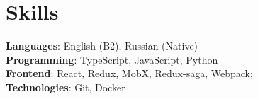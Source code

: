 \documentclass[A4,11pt]{article}
\begin{document}
\section{Skills}
\begin{itemize}[leftmargin=0.5cm, label={}]
  \small{\item{
                \textbf{Languages}{: English (B2), Russian (Native) } \\
                \textbf{Programming}{: TypeScript, JavaScript, Python } \\
                \textbf{Frontend}{: React, Redux, MobX, Redux-saga, Webpack; } \\
                \textbf{Technologies}{: Git, Docker } \\
          }}
\end{itemize}

\end{document}
